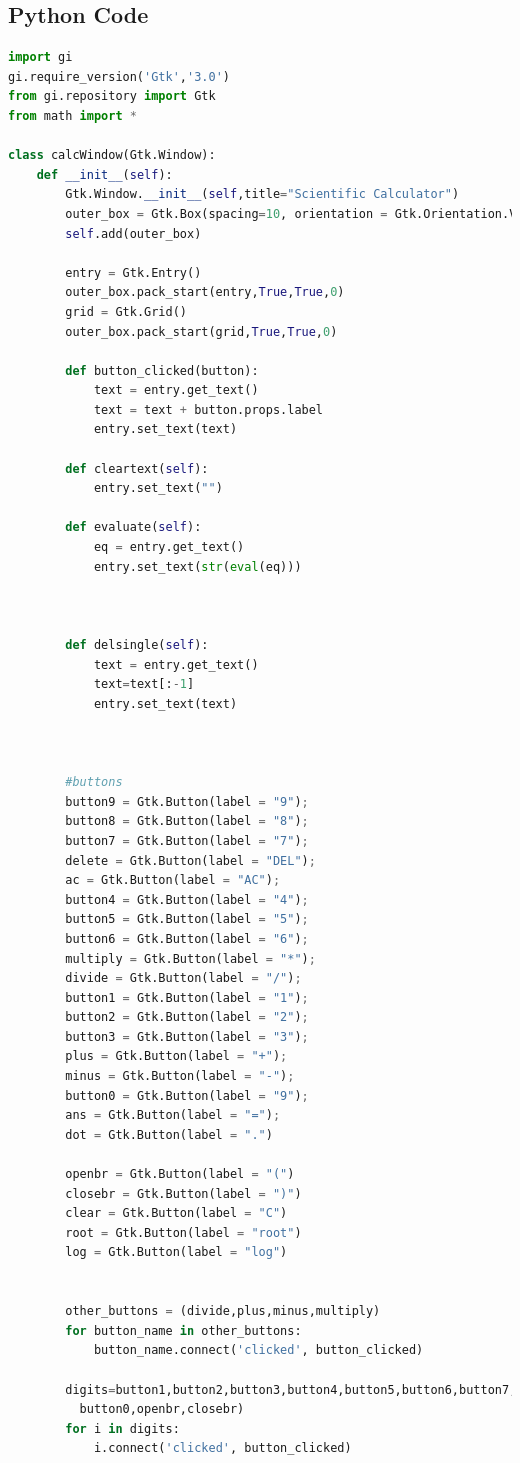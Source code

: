 \documentclass{article}
\begin{document}
 \subsection{Python Code}
 \begin{lstlisting}[language=python, basicstyle = \tiny ]
import gi
gi.require_version('Gtk','3.0')
from gi.repository import Gtk
from math import *

class calcWindow(Gtk.Window):
	def __init__(self):
		Gtk.Window.__init__(self,title="Scientific Calculator")
		outer_box = Gtk.Box(spacing=10, orientation = Gtk.Orientation.VERTICAL)
		self.add(outer_box)

		entry = Gtk.Entry()
		outer_box.pack_start(entry,True,True,0)
		grid = Gtk.Grid()
		outer_box.pack_start(grid,True,True,0)

		def button_clicked(button):
			text = entry.get_text()
			text = text + button.props.label
			entry.set_text(text)
		
		def cleartext(self):
			entry.set_text("")

		def evaluate(self):
			eq = entry.get_text()
			entry.set_text(str(eval(eq)))

		

		def delsingle(self):
			text = entry.get_text()
			text=text[:-1]
			entry.set_text(text)



		#buttons
		button9 = Gtk.Button(label = "9");
		button8 = Gtk.Button(label = "8");
		button7 = Gtk.Button(label = "7");
		delete = Gtk.Button(label = "DEL");
		ac = Gtk.Button(label = "AC");
		button4 = Gtk.Button(label = "4");
		button5 = Gtk.Button(label = "5");
		button6 = Gtk.Button(label = "6");
		multiply = Gtk.Button(label = "*");
		divide = Gtk.Button(label = "/");
		button1 = Gtk.Button(label = "1");
		button2 = Gtk.Button(label = "2");
		button3 = Gtk.Button(label = "3");
		plus = Gtk.Button(label = "+");
		minus = Gtk.Button(label = "-");
		button0 = Gtk.Button(label = "9");
		ans = Gtk.Button(label = "=");
		dot = Gtk.Button(label = ".")

		openbr = Gtk.Button(label = "(")
		closebr = Gtk.Button(label = ")")
		clear = Gtk.Button(label = "C")
		root = Gtk.Button(label = "root")
		log = Gtk.Button(label = "log")


		other_buttons = (divide,plus,minus,multiply)
		for button_name in other_buttons:
			button_name.connect('clicked', button_clicked)

		digits=button1,button2,button3,button4,button5,button6,button7,button8,button9,
          button0,openbr,closebr)
		for i in digits:
			i.connect('clicked', button_clicked)


\end{lstlisting}
\end{document}
